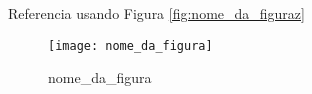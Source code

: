 Referencia usando Figura \ref{fig:nome_da_figuraz}

\begin{figure}[htbp!]
	\centering
	\texttt{[image: nome\_da\_figura]}
	\caption{nome_da_figura}
	\label{fig:nome_da_figura}
\end{figure}
